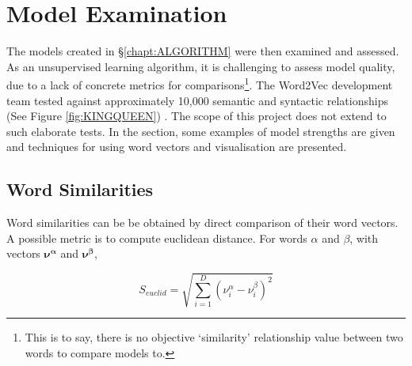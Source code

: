 \chapter{Model Examination}
\label{chapt:VALIDATION}
The models created in \S\ref{chapt:ALGORITHM} were then examined and assessed. As an unsupervised learning algorithm, it is challenging to assess model quality, due to a lack of concrete metrics for comparisons\footnote{This is to say, there is no objective `similarity' relationship value between two words to compare models to.}. The Word2Vec development team tested against approximately 10,000 semantic and syntactic relationships (See Figure \ref{fig:KINGQUEEN})\cite{word2vec1} \cite{word2vec2} \cite{word2veckingqueen}. The scope of this project does not extend to such elaborate tests. In the section, some examples of model strengths are given and techniques for using word vectors and visualisation are presented. 
\section{Word Similarities}
Word similarities can be be obtained by direct comparison of their word vectors. A possible metric is to compute euclidean distance.  For words $\alpha$ and $\beta$, with vectors $\mathbf{\nu^\alpha}$ and $\mathbf{\nu^\beta}$, 

$$S_{euclid} = \sqrt{\sum_{i=1}^{D}(\nu_i^{\alpha}-\nu_i^{\beta})^{2}} $$

